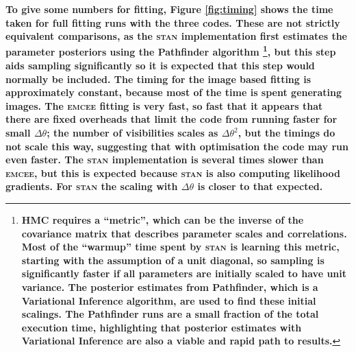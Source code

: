\documentclass[fleqn,usenatbib]{mnras}
\begin{document}
\textbf{To give some numbers for fitting, Figure \ref{fig:timing} shows the time taken for full fitting runs with the three codes. These are not strictly equivalent comparisons, as the \textsc{stan} implementation first estimates the parameter posteriors using the Pathfinder algorithm \citep{JMLR:v23:21-0889}\footnote{\textbf{HMC requires a ``metric'', which can be the inverse of the covariance matrix that describes parameter scales and correlations. Most of the ``warmup'' time spent by \textsc{stan} is learning this metric, starting with the assumption of a unit diagonal, so sampling is significantly faster if all parameters are initially scaled to have unit variance. The posterior estimates from Pathfinder, which is a Variational Inference algorithm, are used to find these initial scalings. The Pathfinder runs are a small fraction of the total execution time, highlighting that posterior estimates with Variational Inference are also a viable and rapid path to results.}}, but this step aids sampling significantly so it is expected that this step would normally be included. The timing for the image based fitting is approximately constant, because most of the time is spent generating images. The \textsc{emcee} fitting is very fast, so fast that it appears that there are fixed overheads that limit the code from running faster for small $\Delta \theta$; the number of visibilities scales as $\Delta \theta^2$, but the timings do not scale this way, suggesting that with optimisation the code may run even faster. The \textsc{stan} implementation is several times slower than \textsc{emcee}, but this is expected because \textsc{stan} is also computing likelihood gradients. For \textsc{stan} the scaling with $\Delta \theta$ is closer to that expected.}

\end{document}
